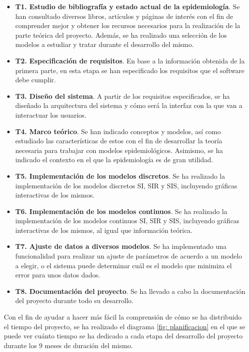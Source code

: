 \begin{itemize}
\item \textbf{T1. Estudio de bibliografía y estado actual de la epidemiología}. Se han consultado diversos libros, artículos y páginas de interés con el fin de comprender mejor y obtener los recursos necesarios para la realización de la parte teórica del proyecto. Además, se ha realizado una selección de los modelos a estudiar y tratar durante el desarrollo del mismo.
\item \textbf{T2. Especificación de requisitos}. En base a la información obtenida de la primera parte, en esta etapa se han especificado los requisitos que el software debe cumplir.
\item \textbf{T3. Diseño del sistema}. A partir de los requisitos especificados, se ha diseñado la arquitectura del sistema y cómo será la interfaz con la que van a interactuar los usuarios.
\item \textbf{T4. Marco teórico}. Se han indicado conceptos y modelos, así como estudiado las características de estos con el fin de desarrollar la teoría necesaria para trabajar con modelos epidemiológicos. Asimismo, se ha indicado el contexto en el que la epidemiología es de gran utilidad.
\item \textbf{T5. Implementación de los modelos discretos}. Se ha realizado la implementación de los modelos discretos SI, SIR y SIS, incluyendo gráficas interactivas de los mismos.
\item \textbf{T6. Implementación de los modelos continuos}. Se ha realizado la implementación de los modelos continuos SI, SIR y SIS, incluyendo gráficas interactivas de los mismos, al igual que información teórica.
\item \textbf{T7. Ajuste de datos a diversos modelos}. Se ha implementado una funcionalidad para realizar un ajuste de parámetros de acuerdo a un modelo a elegir, o el sistema puede determinar cuál es el modelo que minimiza el error para unos datos dados.
\item \textbf{T8. Documentación del proyecto}. Se ha llevado a cabo la documentación del proyecto durante todo su desarrollo.
\end{itemize}

Con el fin de ayudar a hacer más fácil la comprensión de cómo se ha distribuido el tiempo del proyecto, se ha realizado el diagrama \ref{fig: planificacion} en el que se puede ver cuánto tiempo se ha dedicado a cada etapa del desarrollo del proyecto durante los $9$ meses de duración del mismo.

